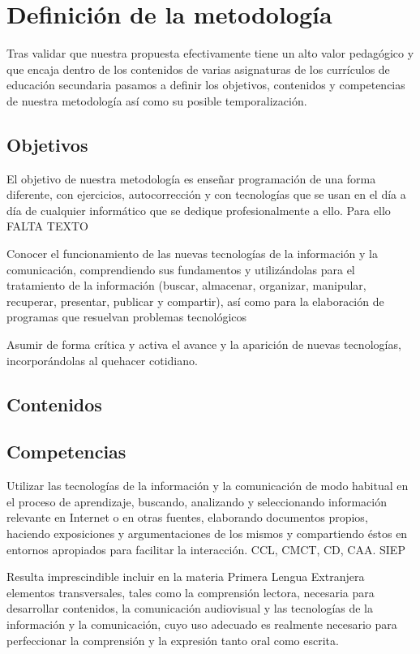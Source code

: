 \section{Definición de la metodología}

Tras validar que nuestra propuesta efectivamente tiene un alto valor pedagógico y que encaja dentro de los contenidos de varias asignaturas de los currículos de educación secundaria pasamos a definir los objetivos, contenidos y competencias de nuestra metodología así como su posible temporalización.

\subsection{Objetivos}

El objetivo de nuestra metodología es enseñar programación de una forma diferente, con ejercicios, autocorrección y con tecnologías que se usan en el día a día de cualquier informático que se dedique profesionalmente a ello. Para ello FALTA TEXTO


Conocer el funcionamiento de las nuevas tecnologías de la información y la comunicación,
comprendiendo sus fundamentos y utilizándolas para el tratamiento de la información (buscar, almacenar,
organizar, manipular, recuperar, presentar, publicar y compartir), así como para la elaboración de programas que
resuelvan problemas tecnológicos

Asumir de forma crítica y activa el avance y la aparición de nuevas tecnologías, incorporándolas al
quehacer cotidiano.


\subsection{Contenidos}




\subsection{Competencias}

Utilizar las tecnologías de la información y la comunicación de modo habitual en el proceso de aprendizaje, buscando, analizando y seleccionando información relevante en Internet o en otras fuentes,  elaborando documentos propios, haciendo exposiciones y argumentaciones de los mismos y compartiendo éstos en entornos apropiados para facilitar la interacción. CCL, CMCT, CD, CAA. SIEP

Resulta imprescindible incluir en la materia Primera Lengua Extranjera elementos transversales, tales como la comprensión lectora, necesaria para desarrollar contenidos, la comunicación audiovisual y las tecnologías de la información y la comunicación, cuyo uso adecuado es realmente necesario para perfeccionar la comprensión y la expresión tanto oral como escrita.

